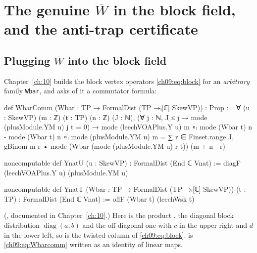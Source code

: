 \section{The genuine \texorpdfstring{$\overline{W}$}{Wbar} in the block field, and the anti-trap certificate}\label{ch09:sec:genuine}

\subsection{Plugging \texorpdfstring{$\overline{W}$}{Wbar} into the block field}

Chapter~\ref{ch:10} builds the block vertex operators \eqref{ch09:eq:block} for an
\emph{arbitrary} family \texttt{Wbar}, and asks of it a commutator formula:
\begin{leancode}
def WbarComm (Wbar : TP → FormalDist (TP →ₗ[ℂ] SkewVP)) : Prop :=
  ∀ (u : SkewVP) (m : ℤ) (t : TP) (n : ℤ) (J : ℕ),
    (∀ j : ℕ, J ≤ j → mode (plusModule.YM u) j t = 0) →
    mode (leechVOAPlus.Y u) m ∘ₗ mode (Wbar t) n - mode (Wbar t) n ∘ₗ mode (plusModule.YM u) m
      = ∑ r ∈ Finset.range J, gBinom m r • mode (Wbar (mode (plusModule.YM u) r t)) (m + n - r)

noncomputable def YnatU (u : SkewVP) : FormalDist (End ℂ Vnat) :=
  diagF (leechVOAPlus.Y u) (plusModule.YM u)

noncomputable def YnatT (Wbar : TP → FormalDist (TP →ₗ[ℂ] SkewVP)) (t : TP) :
    FormalDist (End ℂ Vnat) :=
  offF (Wbar t) (leechWsk t)
\end{leancode}
(, documented in Chapter~\ref{ch:10}.) Here
 is the product ,  the diagonal block distribution
$\operatorname{diag}(a,b)$ and  the off-diagonal one with $c$ in the upper right and
$d$ in the lower left, so  is the twisted column of \eqref{ch09:eq:block}.
 is \eqref{ch09:eq:Wbarcomm} written as an identity of linear maps.


